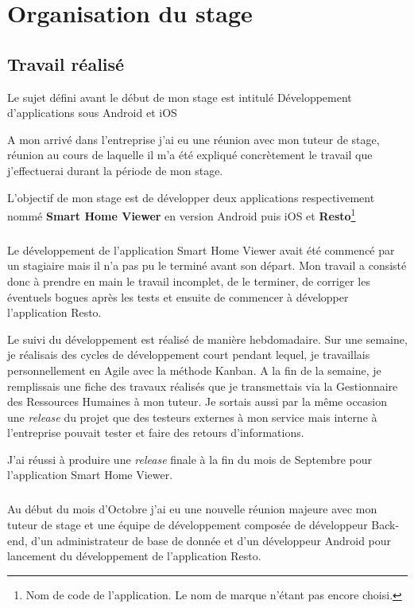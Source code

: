 \chapter{Organisation du stage}
\section*{Travail réalisé}
Le sujet défini avant le début de mon stage est intitulé \og Développement d'applications sous Android et iOS   

A mon arrivé dans l'entreprise j'ai eu une réunion avec mon tuteur de stage, réunion au cours de laquelle il m'a été expliqué concrètement le travail que j'effectuerai durant la période de mon stage.

L'objectif de mon stage est de développer deux applications respectivement nommé \textbf{Smart Home Viewer} en version Android puis iOS et \textbf{Resto}\footnote{Nom de code de l'application. Le nom de marque n'étant pas encore choisi.}
\paragraph*{}
Le développement de l'application Smart Home Viewer avait été commencé par un stagiaire mais il n'a pas pu le terminé avant son départ. Mon travail a consisté donc à prendre en main le travail incomplet, de le terminer, de corriger les éventuels bogues après les tests et ensuite de commencer à développer l'application Resto.

Le suivi du développement est réalisé de manière hebdomadaire. Sur une semaine, je réalisais des cycles de développement court pendant lequel, je travaillais personnellement en Agile avec la méthode Kanban. A la fin de la semaine, je remplissais une fiche des travaux réalisés que je transmettais via la Gestionnaire des Ressources Humaines à mon tuteur. Je sortais aussi par la même occasion une \textit{release} du projet que des testeurs externes à mon service mais interne à l'entreprise pouvait tester et faire des retours d'informations.

J'ai réussi à produire une \textit{release} finale à la fin du mois de Septembre pour l'application Smart Home Viewer.
\paragraph*{}

Au début du mois d'Octobre j'ai eu une nouvelle réunion majeure avec mon tuteur de stage et une équipe de développement composée de développeur Back-end, d'un administrateur de base de donnée et d'un développeur Android pour lancement du développement de l'application Resto.

